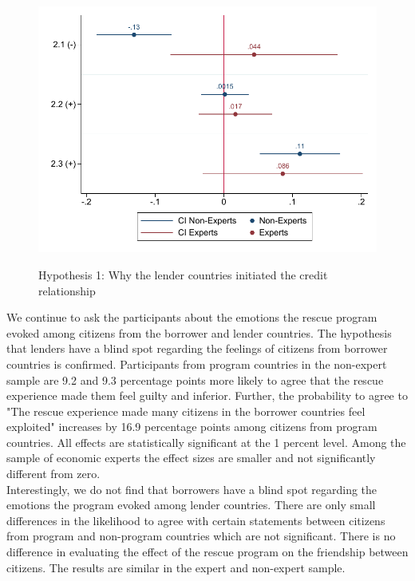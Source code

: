  \begin{figure}[H]
\begin{center}
     \caption{ Hypothesis 1: Why the lender countries initiated the credit relationship}
    
     \includegraphics[scale=0.8]{Question2_base.pdf}
     \label{fig:my_label}
      \end{center}
      \tiny
\end{figure}
 We continue to ask the participants about the emotions the rescue program evoked among citizens from the borrower and lender countries. The hypothesis that lenders have a blind spot regarding the feelings of citizens from borrower countries is confirmed. Participants from program countries in the non-expert sample are 9.2 and 9.3 percentage points more likely to agree that the rescue experience made them feel guilty and inferior. Further, the probability to agree to "The rescue experience made many citizens in the borrower countries feel exploited" increases by 16.9 percentage points among citizens from program countries. All effects are statistically significant at the 1 percent level. Among the sample of economic experts the effect sizes are smaller and not significantly different from zero. \\
 Interestingly, we do not find that borrowers have a blind spot regarding the emotions the program evoked among lender countries. There are only small differences in the likelihood to agree with certain statements between citizens from program and non-program countries which are not significant. There is no difference in evaluating the effect of the rescue program on the friendship between citizens. The results are similar in the expert and non-expert sample. \\

